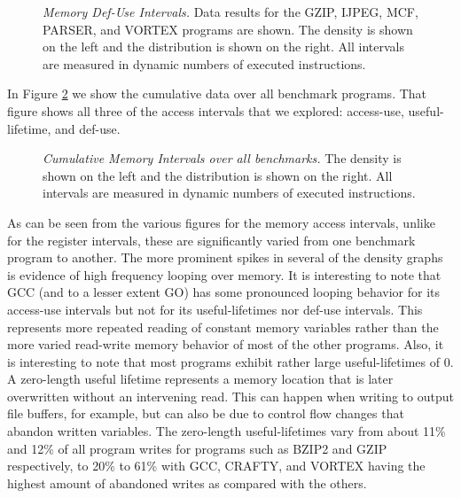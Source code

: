 \documentclass[10pt,dvips]{article}
\begin{document}
%
\begin{figure}
\centering
{}
\caption{{\em Memory Def-Use Intervals.} 
Data results for the
GZIP, IJPEG, MCF, PARSER, and VORTEX programs are shown.
The density is shown on the left and the distribution is shown
on the right.
All intervals are measured in dynamic numbers of executed instructions.}
\label{fig:ab_muse}
\end{figure}
%
%
In Figure \ref{fig:a_mcum} we show the cumulative data over all
benchmark programs.  That figure shows all three of the access
intervals that we explored: access-use, useful-lifetime, and def-use.
%
\begin{figure}[tb]
\centering
{}
\caption{{\em Cumulative Memory Intervals over all benchmarks.} 
The density is shown on the left and the distribution is shown
on the right.
All intervals are measured in dynamic numbers of executed instructions.}
\label{fig:a_mcum}
\end{figure}
%
As can be seen from the various figures for the memory access
intervals, unlike for the register intervals, these are significantly
varied from one benchmark program to another.
The more prominent spikes in several of the density graphs
is evidence of high frequency looping over memory.
It is interesting to note that GCC (and to a lesser extent GO)
has some pronounced
looping behavior for its access-use intervals but not for
its useful-lifetimes nor def-use intervals.
This represents more repeated reading of constant memory variables
rather than the more varied read-write memory behavior of 
most of the other programs.  Also, it is interesting to note
that most programs exhibit rather large useful-lifetimes of 0.
A zero-length useful lifetime represents a memory location that
is later overwritten without an intervening read.  
This
can happen when writing to output file buffers, for example, but can also
be due to control flow changes that abandon written variables.
The zero-length useful-lifetimes vary from about 11\% and 12\% of all
program writes for programs such as BZIP2 and GZIP respectively,
to 20\% to 61\% with GCC, CRAFTY, and VORTEX having the highest
amount of abandoned writes as compared with the others.
%
%
\end{document}
